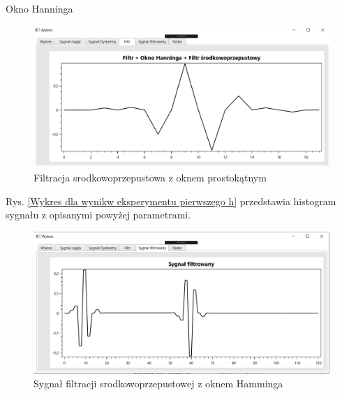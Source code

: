 \documentclass[12pt]{article}
\begin{document}
\newpage
Okno Hanninga
\begin{figure}[h!]
 \centering
 \includegraphics[width=12.3cm]{prostFSOHn.PNG}
 \vspace{-0.3cm}
 \caption{Filtracja srodkowoprzepustowa z oknem prostokątnym}
 \label{Wykres dla wyników eksperymentu drugiego}
\end{figure}
\newpage
Rys. \ref{Wykres dla wynikw eksperymentu pierwszego h} przedstawia histogram sygnału z opisanymi powyżej parametrami. 
\begin{figure}[h!]
 \centering
 \includegraphics[width=12.3cm]{prostSFSHn.PNG}
 \vspace{-0.3cm}
 \caption{Sygnał filtracji srodkowoprzepustowej z oknem Hamminga}
 \label{Histogram dla wyników eksperymentu drugiego}
\end{figure}
\end{document}
